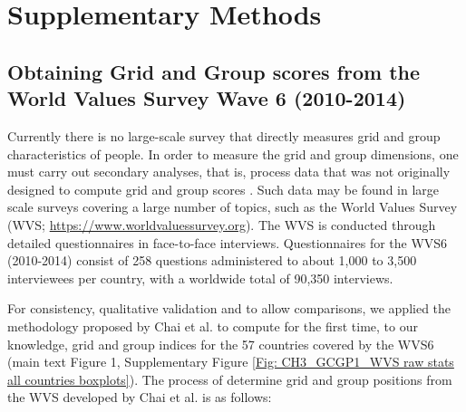 \documentclass[12pt, a4paper]{article}
\begin{document}
\section{Supplementary Methods} \label{SI Methods}


\subsection{Obtaining Grid and Group scores from the World Values Survey Wave 6 (2010-2014)}

Currently there is no large-scale survey that directly measures grid and group characteristics of people. In order to measure the grid and group dimensions, one must carry out secondary analyses, that is, process data that was not originally designed to compute grid and group scores \autocite{Chai:2009vz, Grendstad:1999cp}. Such data may be found in large scale surveys covering a large number of topics, such as the World Values Survey (WVS; \url{https://www.worldvaluessurvey.org}). The WVS is conducted through detailed questionnaires in face-to-face interviews. Questionnaires for the WVS6 (2010-2014) consist of 258 questions administered to about 1,000 to 3,500 interviewees per country, with a worldwide total of 90,350 interviews. 

For consistency, qualitative validation and to allow comparisons, we applied the methodology proposed by Chai et al. \autocite{Chai:2009vz} to compute for the first time, to our knowledge, grid and group indices for the 57 countries covered by the WVS6 (main text Figure 1, Supplementary Figure \ref{Fig: CH3_GCGP1_WVS raw stats all countries boxplots}). The process of determine grid and group positions from the WVS developed by Chai et al. is as follows:
\end{document}
